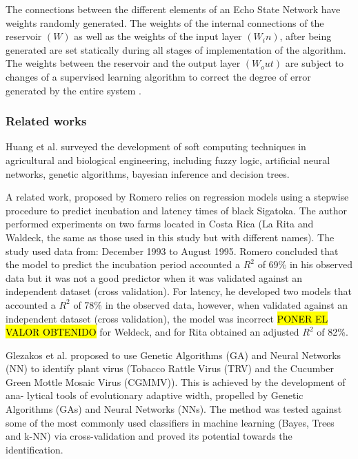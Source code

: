 \documentclass[review]{elsarticle}
\begin{document}
The connections between the different elements of an Echo State Network have weights randomly generated. The weights of the internal connections of the reservoir $(W)$ as well as the weights of the input layer $(W_in)$, after being generated are set statically during all stages of implementation of the algorithm. The weights between the reservoir and the output layer $(W_out)$ are subject to changes of a supervised learning algorithm to correct the degree of error generated by the entire system \citep{Lukose2012}.

\subsubsection{Related works}
Huang et al. \citep{Huang2010}  surveyed the development of soft computing techniques in agricultural and biological engineering, including fuzzy logic, artificial neural networks, genetic algorithms, bayesian inference and decision trees.

A related work, proposed by Romero \citep{Romero1995} relies on regression models using a stepwise procedure to predict incubation and latency times of black Sigatoka. The author performed experiments on two farms located in Costa Rica (La Rita and Waldeck, the same as those used in this study but with different names). The study used data from: December 1993 to August 1995. Romero concluded that the model to predict the incubation period accounted a $R^2$ of 69\% in his observed data but it was not a good predictor when it was validated against an independent dataset (cross validation). For latency, he developed two models that accounted a $R^2$ of 78\% in the observed data, however, when validated against an independent dataset (cross validation), the model was incorrect \hl{PONER EL VALOR OBTENIDO} for Weldeck, and for Rita obtained an adjusted $R^2$ of 82\%. 

Glezakos et al. \citep{Glezakos2010} proposed to use Genetic Algorithms (GA) and Neural Networks (NN) to identify plant virus (Tobacco Rattle Virus (TRV) and the Cucumber Green Mottle Mosaic Virus (CGMMV)). This is achieved by the development of ana- lytical tools of evolutionary adaptive width, propelled by Genetic Algorithms (GAs) and Neural Networks (NNs). The method was tested against some of the most commonly used classifiers in machine learning (Bayes, Trees and k-NN) via cross-validation and proved its potential towards the identification. 
\end{document}
